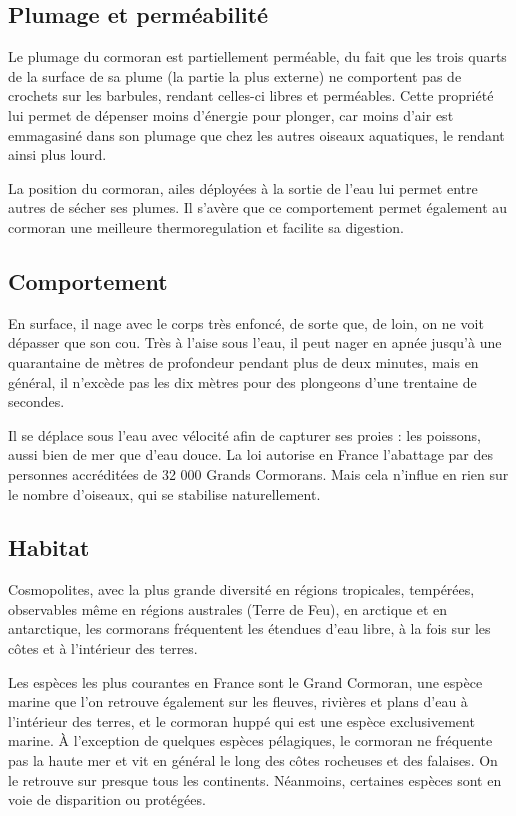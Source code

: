 \documentclass[12pt]{article}
\begin{document}
\subsection*{Plumage et perméabilité}

Le plumage du cormoran est partiellement perméable, du fait que les trois quarts de la surface de sa plume (la partie la plus externe) ne comportent pas de crochets sur les barbules, rendant celles-ci libres et perméables. Cette propriété lui permet de dépenser moins d'énergie pour plonger, car moins d'air est emmagasiné dans son plumage que chez les autres oiseaux aquatiques, le rendant ainsi plus lourd.

La position du cormoran, ailes déployées à la sortie de l’eau lui permet entre autres de sécher ses plumes. Il s’avère que ce comportement permet également au cormoran une meilleure thermoregulation et facilite sa digestion.

\subsection*{Comportement}

En surface, il nage avec le corps très enfoncé, de sorte que, de loin, on ne voit dépasser que son cou. Très à l'aise sous l'eau, il peut nager en apnée jusqu'à une quarantaine de mètres de profondeur pendant plus de deux minutes, mais en général, il n'excède pas les dix mètres pour des plongeons d'une trentaine de secondes.

Il se déplace sous l'eau avec vélocité afin de capturer ses proies  : les poissons, aussi bien de mer que d'eau douce. La loi autorise en France l'abattage par des personnes accréditées de 32 000 Grands Cormorans. Mais cela n'influe en rien sur le nombre d'oiseaux, qui se stabilise naturellement.

\subsection*{Habitat}

Cosmopolites, avec la plus grande diversité en régions tropicales, tempérées, observables même en régions australes (Terre de Feu), en arctique et en antarctique, les cormorans fréquentent les étendues d'eau libre, à la fois sur les côtes et à l'intérieur des terres.

Les espèces les plus courantes en France sont le Grand Cormoran, une espèce marine que l'on retrouve également sur les fleuves, rivières et plans d'eau à l'intérieur des terres, et le cormoran huppé qui est une espèce exclusivement marine. À l'exception de quelques espèces pélagiques, le cormoran ne fréquente pas la haute mer et vit en général le long des côtes rocheuses et des falaises. On le retrouve sur presque tous les continents. Néanmoins, certaines espèces sont en voie de disparition ou protégées.
\end{document}
